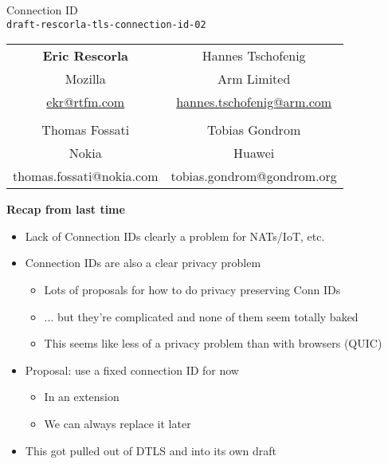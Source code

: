 \documentclass[helvetica]{seminar}
\newcommand{\heading}[1]{%
  \begin{center} 
    \large\bf 
    #1 
  \end{center} 
  \vspace{.4 in}}
\begin{document}
\begin{slide}
\begin{center}
\vspace{.5 in}
\LARGE{{\bf}Connection ID\\{\small \verb^draft-rescorla-tls-connection-id-02^}}\\
\vspace{.2in}
{\small
\begin{tabular}{c c}
\textbf{Eric Rescorla} & Hannes Tschofenig \\
Mozilla& Arm Limited \\ 
  \url{ekr@rtfm.com} & \url{hannes.tschofenig@arm.com} \\
  \\
  Thomas Fossati & Tobias Gondrom \\
  Nokia & Huawei \\
  thomas.fossati@nokia.com & tobias.gondrom@gondrom.org \\
  \end{tabular}

}

\end{center}
\end{slide}

\centerslidesfalse 

\begin{slide}
  \heading{Recap from last time}

  \begin{itemize}
  \item Lack of Connection IDs clearly a problem for NATs/IoT, etc.
  \item Connection IDs are also a clear privacy problem
    \begin{itemize}
    \item Lots of proposals for how to do privacy preserving Conn IDs
    \item ... but they're complicated and none of them seem totally baked
    \item This seems like less of a privacy problem than with browsers (QUIC)     
    \end{itemize}

  \item Proposal: use a fixed connection ID for now
    \begin{itemize}
    \item In an extension
    \item We can always replace it later
    \end{itemize}
    
  \item This got pulled out of DTLS and into its own draft
  \end{itemize}
\end{slide}
\end{document}
